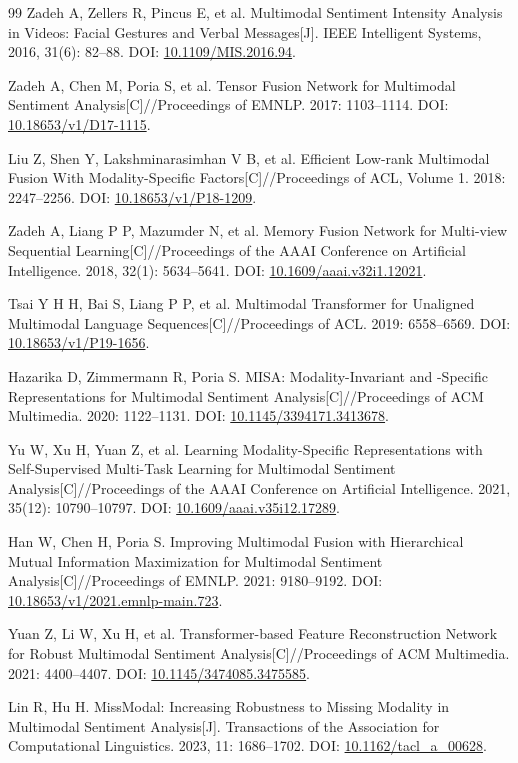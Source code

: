{\begin{thebibliography}{99}
 Zadeh A, Zellers R, Pincus E, et al. Multimodal Sentiment Intensity Analysis in Videos: Facial Gestures and Verbal Messages[J]. IEEE Intelligent Systems, 2016, 31(6): 82--88. DOI: \url{10.1109/MIS.2016.94}.

 Zadeh A, Chen M, Poria S, et al. Tensor Fusion Network for Multimodal Sentiment Analysis[C]//Proceedings of EMNLP. 2017: 1103--1114. DOI: \url{10.18653/v1/D17-1115}.

 Liu Z, Shen Y, Lakshminarasimhan V B, et al. Efficient Low-rank Multimodal Fusion With Modality-Specific Factors[C]//Proceedings of ACL, Volume 1. 2018: 2247--2256. DOI: \url{10.18653/v1/P18-1209}.

 Zadeh A, Liang P P, Mazumder N, et al. Memory Fusion Network for Multi-view Sequential Learning[C]//Proceedings of the AAAI Conference on Artificial Intelligence. 2018, 32(1): 5634--5641. DOI: \url{10.1609/aaai.v32i1.12021}.

 Tsai Y H H, Bai S, Liang P P, et al. Multimodal Transformer for Unaligned Multimodal Language Sequences[C]//Proceedings of ACL. 2019: 6558--6569. DOI: \url{10.18653/v1/P19-1656}.

 Hazarika D, Zimmermann R, Poria S. MISA: Modality-Invariant and -Specific Representations for Multimodal Sentiment Analysis[C]//Proceedings of ACM Multimedia. 2020: 1122--1131. DOI: \url{10.1145/3394171.3413678}.

 Yu W, Xu H, Yuan Z, et al. Learning Modality-Specific Representations with Self-Supervised Multi-Task Learning for Multimodal Sentiment Analysis[C]//Proceedings of the AAAI Conference on Artificial Intelligence. 2021, 35(12): 10790--10797. DOI: \url{10.1609/aaai.v35i12.17289}.

 Han W, Chen H, Poria S. Improving Multimodal Fusion with Hierarchical Mutual Information Maximization for Multimodal Sentiment Analysis[C]//Proceedings of EMNLP. 2021: 9180--9192. DOI: \url{10.18653/v1/2021.emnlp-main.723}.

 Yuan Z, Li W, Xu H, et al. Transformer-based Feature Reconstruction Network for Robust Multimodal Sentiment Analysis[C]//Proceedings of ACM Multimedia. 2021: 4400--4407. DOI: \url{10.1145/3474085.3475585}.

 Lin R, Hu H. MissModal: Increasing Robustness to Missing Modality in Multimodal Sentiment Analysis[J]. Transactions of the Association for Computational Linguistics. 2023, 11: 1686--1702. DOI: \url{10.1162/tacl_a_00628}.


\end{thebibliography}}
